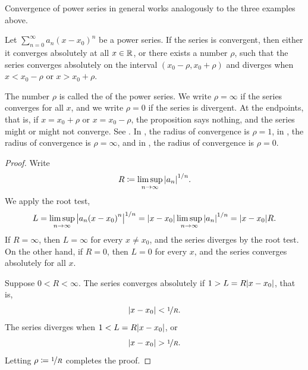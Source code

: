 Convergence of power series in general works analogously to
the three examples above.

\begin{prop} \label{prop:powerserrealradius}
Let $\sum_{n=0}^\infty a_n {(x-x_0)}^n$ be a power series.
If the series is convergent, then either it converges absolutely at
all $x \in {\mathbb{R}}$, or
there exists a number $\rho$, such that
the series converges absolutely on the interval
$(x_0-\rho,x_0+\rho)$ and diverges when $x < x_0-\rho$ or $x > x_0+\rho$.
\end{prop}

The number $\rho$ is called the \emph{} of the
power series.  We write $\rho = \infty$ if the series converges for
all $x$, and we write $\rho = 0$ if the series is divergent.
At the endpoints, that is, if $x = x_0+\rho$ or $x = x_0-\rho$,
the proposition says nothing,
and the series might or might not converge.
See .
In ,
the radius of convergence is $\rho=1$,
in , the radius of convergence is $\rho=\infty$,
and in , the radius of convergence is $\rho=0$.

\begin{myfigureht}
\caption{Convergence of a power series.\label{ps:convfig}}
\end{myfigureht}

\begin{proof}
Write
\begin{equation*}
R \coloneqq \limsup_{n\to\infty} {\lvert {a_n} \rvert}^{1/n} .
\end{equation*}
We apply the root test,
\begin{equation*}
L = \limsup_{n\to\infty} {\bigl\lvert {a_n {(x-x_0)}^n} \bigr\rvert}^{1/n} 
=
\lvert {x-x_0} \rvert \limsup_{n\to\infty} {\lvert {a_n} \rvert}^{1/n}
=
\lvert {x-x_0} \rvert R .
\end{equation*}
If $R = \infty$, then $L=\infty$ for every $x \neq x_0$, and
the series diverges by the root test.
On the other hand,
if $R = 0$, then $L=0$ for every $x$,
and the series converges absolutely for all $x$.

Suppose $0 < R < \infty$.
The series
converges absolutely if
$1 > L = R \lvert {x-x_0} \rvert$,
that is,
\begin{equation*}
\lvert {x-x_0} \rvert < \nicefrac{1}{R} .
\end{equation*}
The series diverges when
$1 < L = R \lvert {x-x_0} \rvert$,
or
\begin{equation*}
\lvert {x-x_0} \rvert > \nicefrac{1}{R} .
\end{equation*}
Letting $\rho \coloneqq \nicefrac{1}{R}$ completes the proof.
\end{proof}

